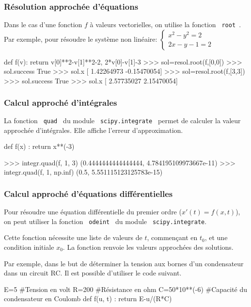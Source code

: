 \begin{frame}[fragile]
\frametitle{Résolution approchée d'équations}

Dans le cas d'une fonction $f$ à valeurs vectorielles, on utilise la fonction \verb? root ?. Par exemple, pour résoudre le système non linéaire:
$\left\{\begin{array}{l} x^2-y^2=2 \\ 2x-y-1=2 
\end{array}\right.$

\begin{GrayBox}[0.85\textwidth]
\begin{verbatimtab}[3]
def f(v): 
	return v[0]**2-v[1]**2-2, 2*v[0]-v[1]-3
>>> sol=resol.root(f,[0,0])
>>> sol.success
True
>>> sol.x
[ 1.42264973 -0.15470054]
>>> sol=resol.root(f,[3,3])
>>> sol.success
True
>>> sol.x
[ 2.57735027  2.15470054]
\end{verbatimtab}
\end{GrayBox}
\end{frame}

\begin{frame}[fragile]
\frametitle{Calcul approché d'intégrales}

La fonction \verb? quad ? du module \verb? scipy.integrate ? permet de calculer la valeur approchée d'intégrales. Elle affiche l'erreur d'approximation.

\begin{GrayBox}[0.85\textwidth]
\begin{verbatimtab}[3]
def f(x) :
	return x**(-3)

>>> integr.quad(f, 1, 3)
(0.4444444444444444, 4.784195109973667e-11)
>>> integr.quad(f, 1, np.inf)
(0.5, 5.551115123125783e-15)
\end{verbatimtab}
\end{GrayBox}
\end{frame}

\begin{frame}[fragile]
\frametitle{Calcul approché d'équations différentielles}

Pour résoudre une équation différentielle du premier ordre ($x'(t)=f(x,t)$), on peut utiliser la fonction \verb? odeint ? du module \verb? scipy.integrate?.

Cette fonction nécessite une liste de valeurs de $t$, commençant en $t_0$, et une condition initiale $x_0$. La fonction renvoie les valeurs approchées des solutions.

Par exemple, dans le but de déterminer la tension aux bornes d'un condensateur dans un circuit RC. Il est possible d'utiliser le code suivant.

\begin{GrayBox}[0.85\textwidth]
\begin{verbatimtab}[3]
E=5 #Tension en volt
R=200 #Résistance en ohm
C=50*10**(-6) #Capacité du condensateur en Coulomb
def f(u, t) :
	return E-u/(R*C)
\end{verbatimtab}
\end{GrayBox}
\end{frame}

